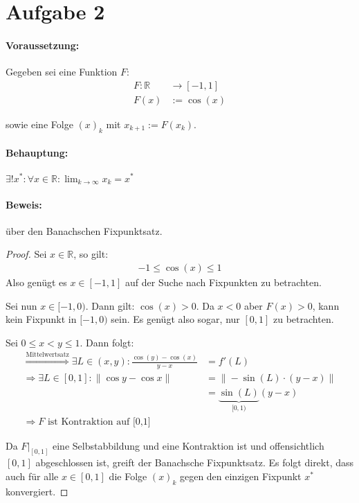 \section*{Aufgabe 2}

\paragraph{Voraussetzung:}
Gegeben sei eine Funktion $F$:
\begin{align*}
    F: \mathbb{R} &\rightarrow [-1, 1]\\
    F(x) &:= \cos(x)
\end{align*}

sowie eine Folge $(x)_k$ mit $x_{k+1} := F(x_k)$.

\paragraph{Behauptung:} $\displaystyle \exists! x^*: \forall x \in \mathbb{R}: \lim_{k \rightarrow \infty} x_k = x^*$

\paragraph{Beweis:} über den Banachschen Fixpunktsatz.
\begin{proof}
Sei $ x \in \mathbb{R}$, so gilt:
\begin{align*}
	-1 \leq \cos(x) \leq 1
\end{align*}
Also genügt es $x \in [-1, 1]$ auf der Suche nach Fixpunkten zu betrachten.

Sei nun $x \in [-1, 0)$. Dann gilt: $\cos(x) > 0$. Da $x <0$ aber $F(x) > 0$,
kann kein Fixpunkt in $[-1, 0)$ sein. Es genügt also sogar,
nur $[0, 1]$ zu betrachten.

Sei $0 \leq x < y \leq 1$. Dann folgt:
\begin{align}
    \stackrel{\text{Mittelwertsatz}}{\Rightarrow} \exists L \in (x,y): \frac{\cos(y) - \cos(x)}{y-x} &= f'(L)\\
    \Rightarrow \exists L \in [0,1]: \| \cos y - \cos x \| &= \| - \sin(L) \cdot (y-x)\| \\
    &= \underbrace{\sin(L)}_{[0,1)} (y-x)\\
   \Rightarrow F \text{ ist Kontraktion auf [0,1]}
\end{align}

Da $F|_{[0,1]}$ eine Selbstabbildung und eine Kontraktion ist und
offensichtlich $[0,1]$ abgeschlossen ist, greift der
Banachsche Fixpunktsatz. Es folgt direkt, dass auch für alle $x \in [0,1]$
die Folge $(x)_k$ gegen den einzigen Fixpunkt $x^*$ konvergiert.
\end{proof}

